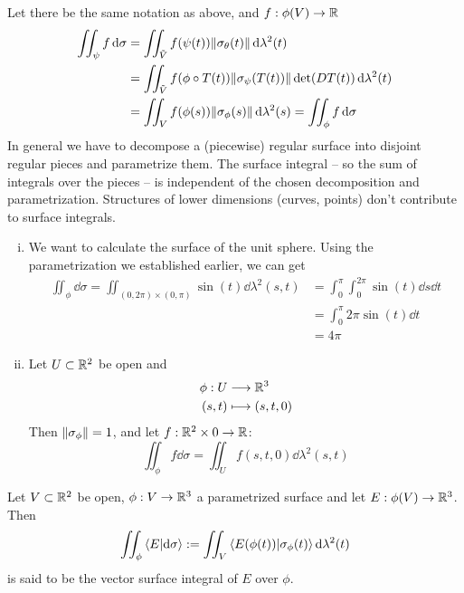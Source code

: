 \documentclass[../../script.tex]{subfiles}
\begin{document}
\begin{rem}
    Let there be the same notation as above, and $f: \phi(V) \rightarrow \mathbb{R}$
    \begin{align*}
        \iint_{\psi} f \dd{\sigma} &= \iint_{\tilde{V}} f(\psi(t)) \norm{\sigma_{\theta}(t)} \dd{\lambda^2(t)} \\
        &= \iint_{\tilde{V}} f(\phi \circ T(t)) \norm{\sigma_{\psi}(T(t))} \det(DT(t)) \dd{\lambda^2(t)} \\
        &= \iint_V f(\phi(s)) \norm{\sigma_{\phi}(s)} \dd{\lambda^2(s)} = \iint_{\phi} f \dd{\sigma}
    \end{align*}
    In general we have to decompose a (piecewise) regular surface into disjoint regular pieces and parametrize them.
    The surface integral – so the sum of integrals over the pieces – is independent of the chosen decomposition and parametrization.
    Structures of lower dimensions (curves, points) don't contribute to surface integrals.
\end{rem}

\begin{eg}
    \begin{enumerate}[(i)]
        \item We want to calculate the surface of the unit sphere. Using the parametrization we established earlier, we can get 
        \begin{align*}
            \iint_{\phi} \dd{\sigma} = \iint_{(0, 2\pi) \times (0, \pi)} \sin(t) \dd{\lambda^2(s, t)} &= \int_0^{\pi} \int_0^{2\pi} \sin(t) \dd{s}\dd{t} \\
            &= \int_0^{\pi} 2\pi \sin(t) \dd{t} \\
            &= 4\pi
        \end{align*}

        \item Let $U \subset \mathbb{R}^2$ be open and 
        \begin{align*}
            \phi: U &\longrightarrow \mathbb{R}^3 \\
            (s, t) &\longmapsto (s, t, 0)
        \end{align*}
        Then $\norm{\sigma_{\phi}} = 1$, and let $f: \mathbb{R}^2 \times 0 \rightarrow \mathbb{R}$:
        \[
            \iint_{\phi} f \dd{\sigma} = \iint_U f(s, t, 0) \dd{\lambda^2(s, t)}
        \]
    \end{enumerate}
\end{eg}

\begin{defi}
    Let $V \subset \mathbb{R}^2$ be open, $\phi: V \rightarrow \mathbb{R}^3$ a parametrized surface and let $E: \phi(V) \rightarrow \mathbb{R}^3$. Then 
    \[
        \iint_{\phi} \innerproduct{E}{\dd{\sigma}} := \iint_V \innerproduct{E(\phi(t))}{\sigma_{\phi}(t)} \dd{\lambda^2(t)}
    \]
    is said to be the vector surface integral of $E$ over $\phi$.
\end{defi}
\end{document}
